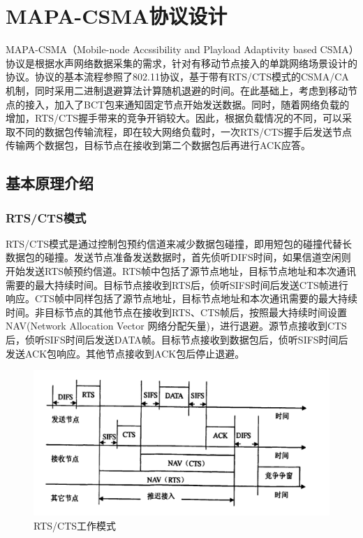 \chapter{MAPA-CSMA协议设计}
MAPA-CSMA（Mobile-node Accssibility and Playload Adaptivity based CSMA）协议是根据水声网络数据采集的需求，针对有移动节点接入的单跳网络场景设计的协议。协议的基本流程参照了802.11协议，基于带有RTS/CTS模式的CSMA/CA机制，同时采用二进制退避算法计算随机退避的时间。在此基础上，考虑到移动节点的接入，加入了BCT包来通知固定节点开始发送数据。同时，随着网络负载的增加，RTS/CTS握手带来的竞争开销较大。因此，根据负载情况的不同，可以采取不同的数据包传输流程，即在较大网络负载时，一次RTS/CTS握手后发送节点传输两个数据包，目标节点在接收到第二个数据包后再进行ACK应答。

\section {基本原理介绍}
\subsection{RTS/CTS模式}
RTS/CTS模式是通过控制包预约信道来减少数据包碰撞，即用短包的碰撞代替长数据包的碰撞。发送节点准备发送数据时，首先侦听DIFS时间，如果信道空闲则开始发送RTS帧预约信道。RTS帧中包括了源节点地址，目标节点地址和本次通讯需要的最大持续时间。目标节点接收到RTS后，侦听SIFS时间后发送CTS帧进行响应。CTS帧中同样包括了源节点地址，目标节点地址和本次通讯需要的最大持续时间。非目标节点的其他节点在接收到RTS、CTS帧后，按照最大持续时间设置NAV(Network Allocation Vector 网络分配矢量)，进行退避。源节点接收到CTS后，侦听SIFS时间后发送DATA帧。目标节点接收到数据包后，侦听SIFS时间后发送ACK包响应。其他节点接收到ACK包后停止退避。
\begin{figure}[ht]
	\centering
	\includegraphics[scale=0.2]{figures/RC.png}
	\caption{
		RTS/CTS工作模式
	}
	\label{fig:example}
\end{figure}
